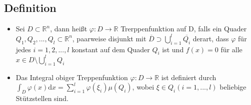 \subsection{Definition}
\begin{itemize}
	\item Sei $D\subset \mathbb{R}^n$, dann heißt $\varphi \colon D \to \mathbb{R}$ Trerppenfunktion auf D, falls ein Quader $Q_1, Q_2,..., Q_l \subset \mathbb{R}^n$, paarweise disjunkt mit $\overline{D} \supset \bigcup_{i=1}^l \overline{Q_i}$ derart, dass $\varphi$ für jedes $i = 1,2,...,l$ konstant auf dem Quader $Q_i$ ist und $f(x) = 0$ für alle $x \in D \setminus \bigcup_{i=1}^l Q_i$
	\item Das Integral obiger Treppenfunktion $\varphi \colon D \to \mathbb{R}$ ist definiert durch $\int_{D} \varphi(x) \text{d}x = \sum_{i= 1}^{l} \varphi(\xi_i)\mu(Q_i)$, wobei $\xi \in Q_i (i=1,...,l)$ beliebige Stützstellen sind.

\end{itemize}
